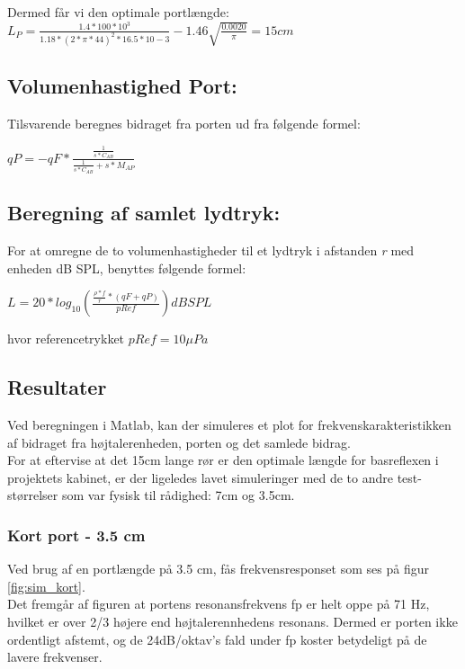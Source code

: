 Dermed får vi den optimale portlængde:\\

\(L_P=\frac{1.4*100*10^3}{1.18*(2*\pi*44)^2*16.5*10-3}-1.46\sqrt{\frac{0.0020}{\pi}}=15cm\)


\subsection{Volumenhastighed Port:}

Tilsvarende beregnes bidraget fra porten ud fra følgende formel:

{\large\(qP=-qF*\)}{\Large \(\frac{\frac{1}{s*C_{AB}}}{\frac{1}{s*C_{AB}}+s*M_{AP}}\) }
\cite{Elektroakustik}


\subsection{Beregning af samlet lydtryk:}

For at omregne de to volumenhastigheder til et lydtryk i afstanden \textit{r} med enheden dB SPL, benyttes følgende formel:

\(L=20*log_{10}(\frac{\frac{\rho*f}{r}*(qF+qP)}{pRef}) dB SPL\)

hvor referencetrykket $pRef=10  \mu Pa$


\subsection{Resultater}

Ved beregningen i Matlab, kan der simuleres et plot for frekvenskarakteristikken af bidraget fra højtalerenheden, porten og det samlede bidrag. \\
For at eftervise at det 15cm lange rør er den optimale længde for basreflexen i projektets kabinet, er der ligeledes lavet simuleringer med de to andre test-størrelser som var fysisk til rådighed: 7cm og 3.5cm.

\subsubsection{Kort port - 3.5 cm}

Ved brug af en portlængde på 3.5 cm, fås frekvensresponset som ses på figur \ref{fig:sim_kort}. \\
Det fremgår af figuren at portens resonansfrekvens fp er helt oppe på 71 Hz, hvilket er over 2/3 højere end højtalerennhedens resonans. Dermed er porten ikke ordentligt afstemt, og de 24dB/oktav's fald under fp koster betydeligt på de lavere frekvenser. 

